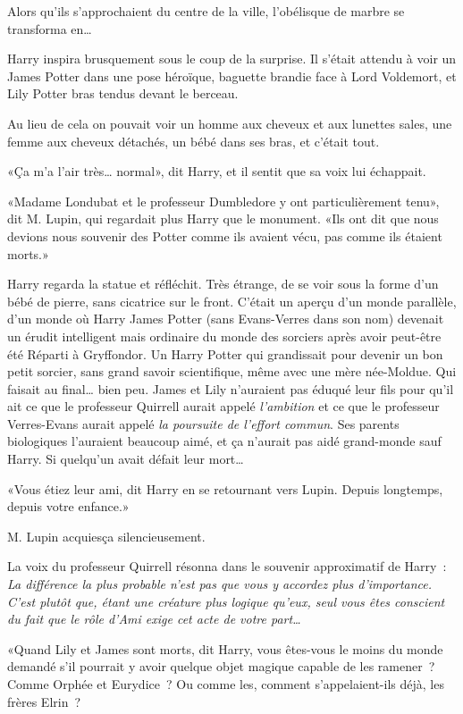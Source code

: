 Alors qu'ils s'approchaient du centre de la ville, l'obélisque de marbre se transforma en…

Harry inspira brusquement sous le coup de la surprise. Il s'était attendu à voir un James Potter dans une pose héroïque, baguette brandie face à Lord Voldemort, et Lily Potter bras tendus devant le berceau.

Au lieu de cela on pouvait voir un homme aux cheveux et aux lunettes sales, une femme aux cheveux détachés, un bébé dans ses bras, et c'était tout.

«Ça m'a l'air très… normal», dit Harry, et il sentit que sa voix lui échappait.

«Madame Londubat et le professeur Dumbledore y ont particulièrement tenu», dit M. Lupin, qui regardait plus Harry que le monument. «Ils ont dit que nous devions nous souvenir des Potter comme ils avaient vécu, pas comme ils étaient morts.»

Harry regarda la statue et réfléchit. Très étrange, de se voir sous la forme d'un bébé de pierre, sans cicatrice sur le front. C'était un aperçu d'un monde parallèle, d'un monde où Harry James Potter (sans Evans-Verres dans son nom) devenait un érudit intelligent mais ordinaire du monde des sorciers après avoir peut-être été Réparti à Gryffondor. Un Harry Potter qui grandissait pour devenir un bon petit sorcier, sans grand savoir scientifique, même avec une mère née-Moldue. Qui faisait au final… bien peu. James et Lily n'auraient pas éduqué leur fils pour qu'il ait ce que le professeur Quirrell aurait appelé \emph{l'ambition} et ce que le professeur Verres-Evans aurait appelé \emph{la poursuite de l'effort commun}. Ses parents biologiques l'auraient beaucoup aimé, et ça n'aurait pas aidé grand-monde sauf Harry. Si quelqu'un avait défait leur mort…

«Vous étiez leur ami, dit Harry en se retournant vers Lupin. Depuis longtemps, depuis votre enfance.»

M. Lupin acquiesça silencieusement.

La voix du professeur Quirrell résonna dans le souvenir approximatif de Harry~: \emph{La différence la plus probable n'est pas que vous y accordez plus d'importance. C'est plutôt que, étant une créature plus logique qu'eux, seul vous êtes conscient du fait que le rôle d'Ami exige cet acte de votre part…}

«Quand Lily et James sont morts, dit Harry, vous êtes-vous le moins du monde demandé s'il pourrait y avoir quelque objet magique capable de les ramener~? Comme Orphée et Eurydice~? Ou comme les, comment s'appelaient-ils déjà, les frères Elrin~?

